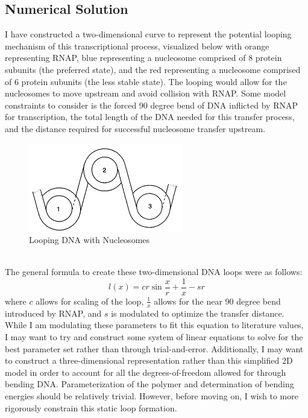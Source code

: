\documentclass[10pt]{article}
\begin{document}
\subsection*{Numerical Solution}
 I have constructed a two-dimensional curve to represent the potential looping mechanism of this transcriptional process, visualized below with orange representing RNAP, blue representing a nucleosome comprised of 8 protein subunits (the preferred state), and the red representing a nucleosome comprised of 6 protein subunits (the less stable state). The looping would allow for the nucleosomes to move upstream and avoid collision with RNAP. Some model constraints to consider is the forced 90 degree bend of DNA inflicted by RNAP for transcription, the total length of the DNA needed for this transfer process, and the distance required for successful nucleosome transfer upstream.
  \begin{figure}[!htb]
    \begin{minipage}{\textwidth}
     \caption{Looping DNA with Nucleosomes}
     \centering
     \includegraphics[width=0.6\textwidth]{hi.png}
   \end{minipage}\hfill
 \end{figure}\\
  The general formula to create these two-dimensional DNA loops were as follows:
 \begin{equation}
 l(x) = cr\sin{\frac{x}{r}} + \frac{1}{x} - sr
 \end{equation}
where $c$ allows for scaling of the loop, $\frac{1}{x}$ allows for the near 90 degree bend introduced by RNAP, and $s$ is modulated to optimize the transfer distance. While I am modulating these parameters to fit this equation to literature values, I may want to try and construct some system of linear equations to solve for the best parameter set rather than through trial-and-error. Additionally, I may want to construct a three-dimensional representation rather than this simplified 2D model in order to account for all the degrees-of-freedom allowed for through bending DNA. Parameterization of the polymer and determination of bending energies should be relatively trivial. However, before moving on, I wish to more rigorously constrain this static loop formation.\\
\end{document}
